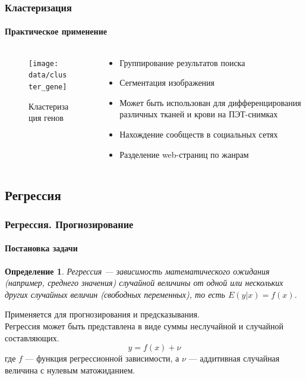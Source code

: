 \documentclass[xcolor=table]{beamer}
\newtheorem{defn}{Определение}
\begin{document}
\begin{frame}
  \frametitle{Кластеризация}
  \framesubtitle{Практическое применение}

  \begin{columns}
    \begin{column}{0.4\textwidth}
      \begin{figure}
        \texttt{[image: data/cluster\_gene]}
        \caption{Кластеризация генов}
        \end{figure}
    \end{column}
    
    \begin{column}{0.6\textwidth}
      \begin{itemize}
      \item Группирование результатов поиска
      \item Сегментация изображения
      \item Может быть использован для дифференцирования различных тканей и крови на ПЭТ-снимках
      \item Нахождение сообществ в социальных сетях
      \item Разделение web-страниц по жанрам
      \end{itemize}
    \end{column}
  \end{columns}
\end{frame}

\subsection{Регрессия}

\begin{frame}
  \frametitle{Регрессия. Прогнозирование}
  \framesubtitle{Постановка задачи}

  \begin{defn}
    Регрессия — зависимость математического ожидания (например, среднего значения) случайной величины от одной или нескольких других случайных величин (свободных переменных), то есть $E(y|x) = f(x)$.
  \end{defn}
  Применяется для \alert{прогнозирования} и \alert{предсказывания}.\\
  Регрессия может быть представлена в виде суммы неслучайной и случайной составляющих.
  \[y = f(x) + \nu\]
  где $f$ — функция регрессионной зависимости, а $\nu$ — аддитивная случайная величина с нулевым матожиданием.
\end{frame}
\end{document}

